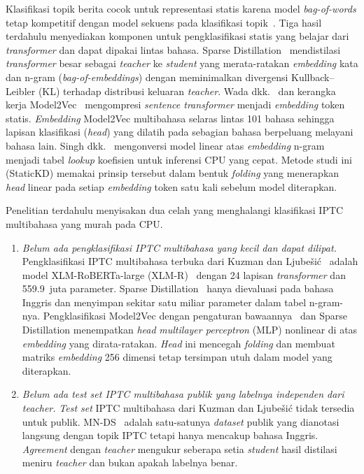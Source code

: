 \documentclass{ieeeaccess}
\newcommand{\en}[1]{\textit{#1}}
\begin{document}
Klasifikasi topik berita cocok untuk representasi statis karena model \en{bag-of-words} tetap kompetitif dengan model sekuens pada klasifikasi topik~\cite{galke2022bow}. Tiga hasil terdahulu menyediakan komponen untuk pengklasifikasi statis yang belajar dari \en{transformer} dan dapat dipakai lintas bahasa. Sparse Distillation~\cite{ye2022sparse} mendistilasi \en{transformer} besar sebagai \en{teacher} ke \en{student} yang merata-ratakan \en{embedding} kata dan n-gram (\en{bag-of-embeddings}) dengan meminimalkan divergensi Kullback--Leibler (KL) terhadap distribusi keluaran \en{teacher}. Wada dkk.~\cite{wada2025static} dan kerangka kerja Model2Vec~\cite{tulkens2024model2vec} mengompresi \en{sentence transformer} menjadi \en{embedding} token statis. \en{Embedding} Model2Vec multibahasa selaras lintas 101 bahasa sehingga lapisan klasifikasi (\en{head}) yang dilatih pada sebagian bahasa berpeluang melayani bahasa lain. Singh dkk.~\cite{singh2023auglinear} mengonversi model linear atas \en{embedding} n-gram menjadi tabel \en{lookup} koefisien untuk inferensi CPU yang cepat. Metode studi ini (StaticKD) memakai prinsip tersebut dalam bentuk \en{folding} yang menerapkan \en{head} linear pada setiap \en{embedding} token satu kali sebelum model diterapkan.

Penelitian terdahulu menyisakan dua celah yang menghalangi klasifikasi IPTC multibahasa yang murah pada CPU.
\begin{enumerate}
  \item \emph{Belum ada pengklasifikasi IPTC multibahasa yang kecil dan dapat dilipat.} Pengklasifikasi IPTC multibahasa terbuka dari Kuzman dan Ljube\v{s}i\'c~\cite{kuzman2025llm} adalah model XLM-RoBERTa-large (XLM-R)~\cite{conneau2020xlmr} dengan 24 lapisan \en{transformer} dan 559.9~juta parameter. Sparse Distillation~\cite{ye2022sparse} hanya dievaluasi pada bahasa Inggris dan menyimpan sekitar satu miliar parameter dalam tabel n-gram-nya. Pengklasifikasi Model2Vec dengan pengaturan bawaannya~\cite{tulkens2024model2vec} dan Sparse Distillation menempatkan \en{head} \en{multilayer perceptron} (MLP) nonlinear di atas \en{embedding} yang dirata-ratakan. \en{Head} ini mencegah \en{folding} dan membuat matriks \en{embedding} 256 dimensi tetap tersimpan utuh dalam model yang diterapkan.
  \item \emph{Belum ada \en{test set} IPTC multibahasa publik yang labelnya independen dari \en{teacher}.} \en{Test set} IPTC multibahasa dari Kuzman dan Ljube\v{s}i\'c tidak tersedia untuk publik. MN-DS~\cite{petukhova2023mnds} adalah satu-satunya \en{dataset} publik yang dianotasi langsung dengan topik IPTC tetapi hanya mencakup bahasa Inggris. \en{Agreement} dengan \en{teacher} mengukur seberapa setia \en{student} hasil distilasi meniru \en{teacher} dan bukan apakah labelnya benar.
\end{enumerate}
\end{document}

